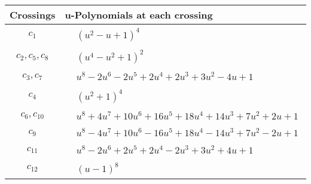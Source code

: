 \documentclass[1p]{elsarticle_modified}
\theoremstyle{definition}
\begin{document}
\begin{tabular}{m{50pt}|m{274pt}}
Crossings & \hspace{64pt}u-Polynomials at each crossing \\
\hline $$\begin{aligned}c_{1}\end{aligned}$$&$\begin{aligned}
&(u^2- u+1)^4
\end{aligned}$\\
\hline $$\begin{aligned}c_{2},c_{5},c_{8}\end{aligned}$$&$\begin{aligned}
&(u^4- u^2+1)^2
\end{aligned}$\\
\hline $$\begin{aligned}c_{3},c_{7}\end{aligned}$$&$\begin{aligned}
&u^8-2 u^6-2 u^5+2 u^4+2 u^3+3 u^2-4 u+1
\end{aligned}$\\
\hline $$\begin{aligned}c_{4}\end{aligned}$$&$\begin{aligned}
&(u^2+1)^4
\end{aligned}$\\
\hline $$\begin{aligned}c_{6},c_{10}\end{aligned}$$&$\begin{aligned}
&u^8+4 u^7+10 u^6+16 u^5+18 u^4+14 u^3+7 u^2+2 u+1
\end{aligned}$\\
\hline $$\begin{aligned}c_{9}\end{aligned}$$&$\begin{aligned}
&u^8-4 u^7+10 u^6-16 u^5+18 u^4-14 u^3+7 u^2-2 u+1
\end{aligned}$\\
\hline $$\begin{aligned}c_{11}\end{aligned}$$&$\begin{aligned}
&u^8-2 u^6+2 u^5+2 u^4-2 u^3+3 u^2+4 u+1
\end{aligned}$\\
\hline $$\begin{aligned}c_{12}\end{aligned}$$&$\begin{aligned}
&(u-1)^8
\end{aligned}$\\
\hline
\end{tabular}\\~\\
\end{document}
